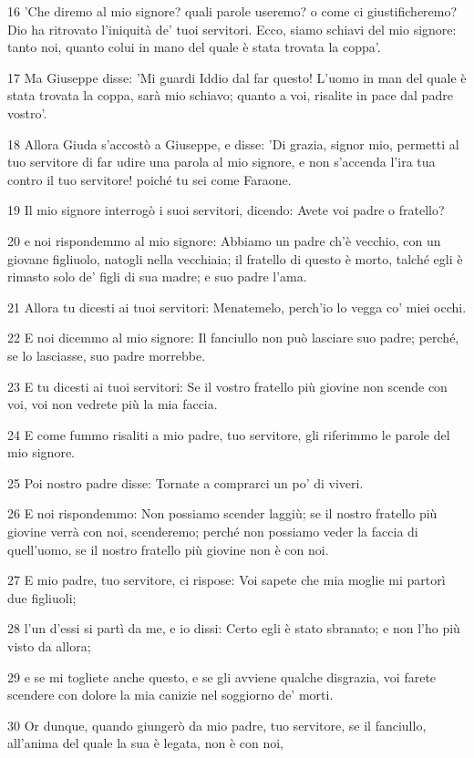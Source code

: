 \par 16 'Che diremo al mio signore? quali parole useremo? o come ci giustificheremo? Dio ha ritrovato l'iniquità de' tuoi servitori. Ecco, siamo schiavi del mio signore: tanto noi, quanto colui in mano del quale è stata trovata la coppa'.
\par 17 Ma Giuseppe disse: 'Mi guardi Iddio dal far questo! L'uomo in man del quale è stata trovata la coppa, sarà mio schiavo; quanto a voi, risalite in pace dal padre vostro'.
\par 18 Allora Giuda s'accostò a Giuseppe, e disse: 'Di grazia, signor mio, permetti al tuo servitore di far udire una parola al mio signore, e non s'accenda l'ira tua contro il tuo servitore! poiché tu sei come Faraone.
\par 19 Il mio signore interrogò i suoi servitori, dicendo: Avete voi padre o fratello?
\par 20 e noi rispondemmo al mio signore: Abbiamo un padre ch'è vecchio, con un giovane figliuolo, natogli nella vecchiaia; il fratello di questo è morto, talché egli è rimasto solo de' figli di sua madre; e suo padre l'ama.
\par 21 Allora tu dicesti ai tuoi servitori: Menatemelo, perch'io lo vegga co' miei occhi.
\par 22 E noi dicemmo al mio signore: Il fanciullo non può lasciare suo padre; perché, se lo lasciasse, suo padre morrebbe.
\par 23 E tu dicesti ai tuoi servitori: Se il vostro fratello più giovine non scende con voi, voi non vedrete più la mia faccia.
\par 24 E come fummo risaliti a mio padre, tuo servitore, gli riferimmo le parole del mio signore.
\par 25 Poi nostro padre disse: Tornate a comprarci un po' di viveri.
\par 26 E noi rispondemmo: Non possiamo scender laggiù; se il nostro fratello più giovine verrà con noi, scenderemo; perché non possiamo veder la faccia di quell'uomo, se il nostro fratello più giovine non è con noi.
\par 27 E mio padre, tuo servitore, ci rispose: Voi sapete che mia moglie mi partorì due figliuoli;
\par 28 l'un d'essi si partì da me, e io dissi: Certo egli è stato sbranato; e non l'ho più visto da allora;
\par 29 e se mi togliete anche questo, e se gli avviene qualche disgrazia, voi farete scendere con dolore la mia canizie nel soggiorno de' morti.
\par 30 Or dunque, quando giungerò da mio padre, tuo servitore, se il fanciullo, all'anima del quale la sua è legata, non è con noi,
